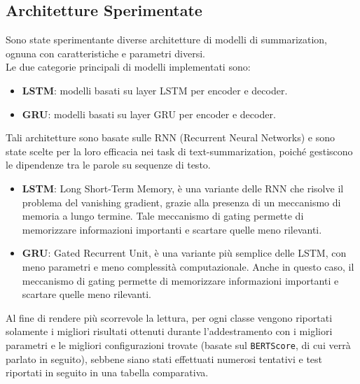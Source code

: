 \subsection{Architetture Sperimentate}
Sono state sperimentante diverse architetture di modelli di summarization, ognuna con caratteristiche e parametri diversi.\\
Le due categorie principali di modelli implementati sono:
\begin{itemize}
    \item \textbf{LSTM}: modelli basati su layer LSTM per encoder e decoder.
    \item \textbf{GRU}: modelli basati su layer GRU per encoder e decoder.
\end{itemize}
Tali architetture sono basate sulle RNN (Recurrent Neural Networks) e sono state scelte per la loro efficacia nei task di text-summarization, poiché 
gestiscono le dipendenze tra le parole su sequenze di testo.\\ 
\begin{itemize}
    \item \textbf{LSTM}: Long Short-Term Memory, è una variante delle RNN che risolve il problema del vanishing gradient, grazie alla presenza di un meccanismo di memoria a lungo termine.
    Tale meccanismo di gating permette di memorizzare informazioni importanti e scartare quelle meno rilevanti.
    \item \textbf{GRU}: Gated Recurrent Unit, è una variante più semplice delle LSTM, con meno parametri e meno complessità computazionale.
    Anche in questo caso, il meccanismo di gating permette di memorizzare informazioni importanti e scartare quelle meno rilevanti.
\end{itemize}

Al fine di rendere più scorrevole la lettura, per ogni classe vengono riportati solamente i migliori risultati ottenuti durante l'addestramento con i migliori parametri e le migliori configurazioni trovate (basate sul \texttt{BERTScore}, di cui verrà parlato in seguito), sebbene
siano stati effettuati numerosi tentativi e test riportati in seguito in una tabella comparativa.\\





%
